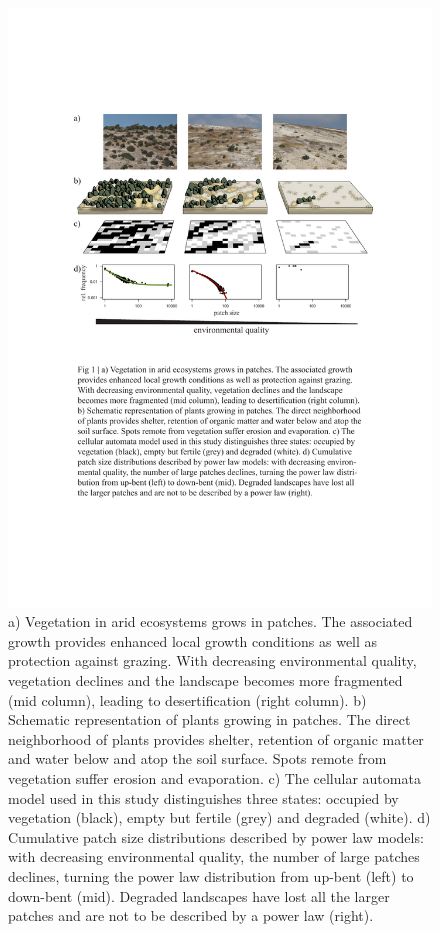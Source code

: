 \begin{figure}[t]
	\centering
		\includegraphics{figures/fig1.pdf}
	\caption{a) Vegetation in arid ecosystems grows in patches. The associated growth provides enhanced local growth conditions as well as protection against grazing. With decreasing environmental quality, vegetation declines and the landscape becomes more fragmented (mid column), leading to desertification (right column). b) Schematic representation of plants growing in patches. The direct neighborhood of plants provides shelter, retention of organic matter and water below and atop the soil surface. Spots remote from vegetation suffer erosion and evaporation. c) The cellular automata model used in this study distinguishes three states: occupied by vegetation (black), empty but fertile (grey) and degraded (white). d) Cumulative patch size distributions described by power law models: with decreasing environmental quality, the number of large patches declines, turning the power law distribution from up-bent (left) to down-bent (mid). Degraded landscapes have lost all the larger patches and are not to be described by a power law (right). }
	\label{fig:fig1}
\end{figure}



